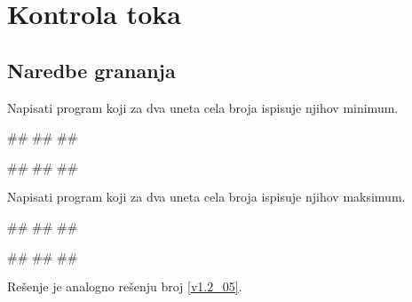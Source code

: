 \chapter{Kontrola toka}


\section{Naredbe grananja}


\begin{Exercise}[label=v1.2_05] 
Napisati program koji za dva uneta cela broja  ispisuje njihov minimum.

\begin{miditest}
\begin{upotreba}{1}
#\naslovInt#
##
##
\end{upotreba}
\end{miditest}
\begin{miditest}
\begin{upotreba}{2}
#\naslovInt#
##
##
\end{upotreba}
\end{miditest}

\end{Exercise}
\begin{Answer}[ref=v1.2_05]
\end{Answer}


\begin{Exercise}[label=v1.2_05a] 
Napisati program koji za dva uneta cela broja ispisuje njihov maksimum. 

\begin{miditest}
\begin{upotreba}{1}
#\naslovInt#
##
##
\end{upotreba}
\end{miditest}
\begin{miditest}
\begin{upotreba}{2}
#\naslovInt#
##
##
\end{upotreba}
\end{miditest}

\end{Exercise}
\begin{Answer}[ref=v1.2_05a]	
Rešenje je analogno rešenju broj \ref{v1.2_05}.
\end{Answer}



